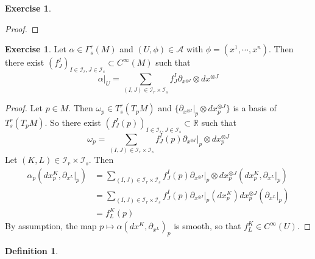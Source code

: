 \documentclass[12pt]{amsart}
\theoremstyle{definition}
\newtheorem{defn}[definition]{Definition}
\newtheorem{ex}[definition]{Exercise}
\newcommand{\al}{\alpha}
\newcommand{\Gam}{\Gamma}
\newcommand{\om}{\omega}
\newcommand{\R}{\mathbb{R}}
\newcommand{\MA}{\mathcal{A}}
\newcommand{\MI}{\mathcal{I}}
\begin{document}
	
	\begin{ex}
	
	\end{ex}
	
	\begin{proof}
	
	\end{proof}
	
	\begin{ex}
		Let $\al \in \Gam^r_s(M)$ and $(U, \phi) \in \MA$ with $\phi = (x^1, \cdots, x^n)$. Then there exist $(f^I_J)_{I \in \MI_r, J \in \MI_s} \subset C^{\infty}(M)$ such that $$\al|_U = \sum_{(I,J) \in \MI_r \times \MI_s} f^I_J \partial_{x^{\otimes I}} \otimes dx^{\otimes J}$$ 
	\end{ex}

	\begin{proof}
		Let $p \in M$. Then $\om_p \in T^r_s(T_pM)$ and $\bigg \{\partial_{x^{\otimes I}}|_p \otimes dx^{\otimes J}_p \bigg \}$ is a basis of $T^r_s(T_pM)$. So there exist $(f^I_J(p))_{I \in \MI_r, J \in \MI_s } \subset \R$ such that $$\om_p = \sum\limits_{(I,J) \in \MI_r \times \MI_s } f^I_J(p) \partial_{x^{\otimes I}}|_p \otimes dx^{\otimes J}_p $$
		Let $(K,L) \in \MI_r \times \MI_s$. Then 
		\begin{align*}
		\al_p(dx^K_p, \partial_{x^L}|_p) 
		&=  \sum\limits_{(I,J) \in \MI_r \times \MI_s } f^I_J(p) \partial_{x^{\otimes I}}|_p \otimes dx^{\otimes J}_p(dx^K_p, \partial_{x^L}|_p) \\
		&= \sum\limits_{(I,J) \in \MI_r \times \MI_s } f^I_J(p) \partial_{x^{\otimes I}}|_p (dx^K_p) dx^{\otimes J}_p(\partial_{x^L}|_p)  \\
		&= f^K_L(p)
		\end{align*}
		By assumption, the map $p \mapsto \al(dx^K, \partial_{x^L})_p$ is smooth, so that $f^K_L \in C^{\infty}(U)$.
	
	\end{proof}
	
	\begin{defn}
	
	\end{defn}	
	
	
	
	
	
	
	
	
	
	
	
	
	
	
	
	
	
	
	
	
	
\end{document}
